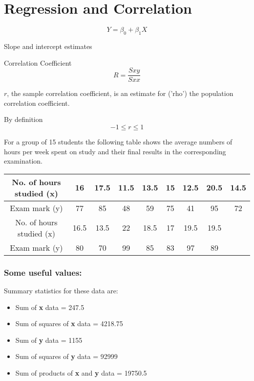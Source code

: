 \documentclass{beamer}
\begin{document}
\section*{Regression and Correlation}

\begin{frame}

\[Y= \beta_0 +\beta_1X\]

Slope and intercept estimates
 
Correlation Coefficient
\[R =\frac{Sxy}{Sxx}\]

$r$, the sample correlation coefficient, is an estimate for  ('rho') the population correlation coefficient.
 
By definition
    \[-1\leq r \leq 1\]
    
\end{frame}   
\begin{frame}


For a group of 15 students the following table shows the average numbers of hours per
week spent on study and their final results in the corresponding examination.

\begin{tabular}{|c|c|c|c|c|c|c|c|c|}
  \hline
  No. of hours studied (x) & 16 & 17.5 & 11.5 & 13.5 & 15 & 12.5 & 20.5 & 14.5 \\ \hline
  Exam mark (y) & 77 & 85 & 48 & 59 & 75 & 41 &  95 & 72   \\ \hline \hline
  No. of hours studied (x) & 16.5 & 13.5 & 22 & 18.5 & 17 & 19.5 & 19.5&\\ \hline
  Exam mark (y) & 80 & 70 & 99 & 85 &83 & 97 & 89 &  \\
  \hline
\end{tabular}


\end{frame}
\begin{frame}
\frametitle{Some useful values:}

Summary statistics for these data are:
\begin{itemize}
\item Sum of \textbf{x} data = 247.5
\item Sum of squares of \textbf{x} data = 4218.75
\item Sum of \textbf{y} data = 1155
\item Sum of squares of \textbf{y} data = 92999
\item Sum of products of \textbf{x} and \textbf{y} data = 19750.5
\end{itemize}
\end{frame}
\end{document}
